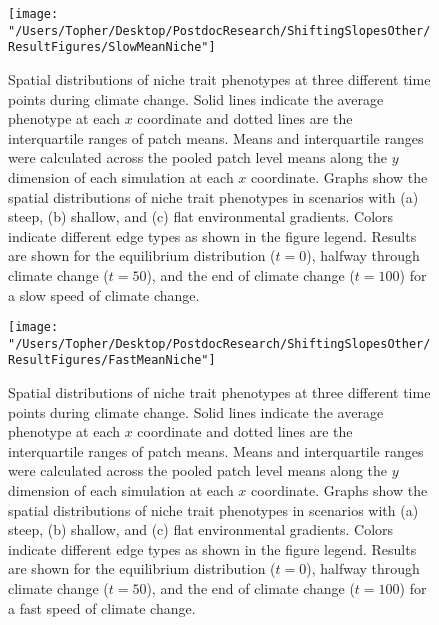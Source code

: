 \documentclass[11pt]{article}
\begin{document}
\begin{figure}[h!]
\texttt{[image: "/Users/Topher/Desktop/PostdocResearch/ShiftingSlopesOther/ResultFigures/SlowMeanNiche"]}
\caption{Spatial distributions of niche trait phenotypes at three different time points during climate change. Solid lines indicate the average phenotype at each $x$ coordinate and dotted lines are the interquartile ranges of patch means. Means and interquartile ranges were calculated across the pooled patch level means along the $y$ dimension of each simulation at each $x$ coordinate. Graphs show the spatial distributions of niche trait phenotypes in scenarios with (a) steep, (b) shallow, and (c) flat environmental gradients. Colors indicate different edge types as shown in the figure legend. Results are shown for the equilibrium distribution ($t = 0$), halfway through climate change ($t = 50$), and the end of climate change ($t = 100$) for a slow speed of climate change.}
\label{Fig:MeanNicheSlow}
\end{figure}

\clearpage

\begin{figure}[h!]
\texttt{[image: "/Users/Topher/Desktop/PostdocResearch/ShiftingSlopesOther/ResultFigures/FastMeanNiche"]}
\caption{Spatial distributions of niche trait phenotypes at three different time points during climate change. Solid lines indicate the average phenotype at each $x$ coordinate and dotted lines are the interquartile ranges of patch means. Means and interquartile ranges were calculated across the pooled patch level means along the $y$ dimension of each simulation at each $x$ coordinate. Graphs show the spatial distributions of niche trait phenotypes in scenarios with (a) steep, (b) shallow, and (c) flat environmental gradients. Colors indicate different edge types as shown in the figure legend. Results are shown for the equilibrium distribution ($t = 0$), halfway through climate change ($t = 50$), and the end of climate change ($t = 100$) for a fast speed of climate change.}
\label{Fig:MeanNicheFast}
\end{figure}

\clearpage
\end{document}
